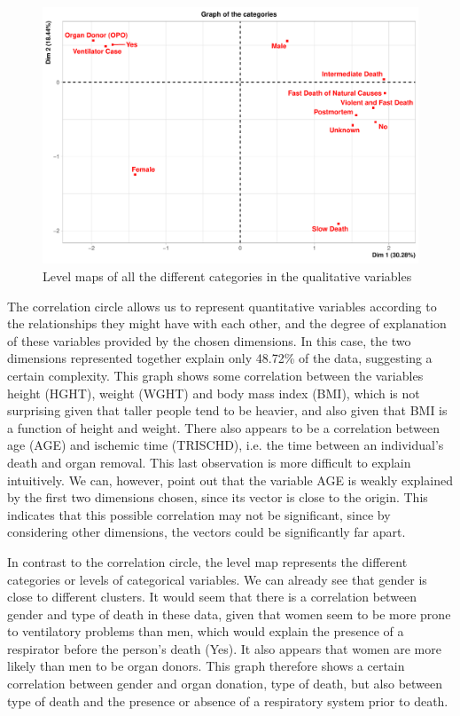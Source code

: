 \documentclass[a4paper, 11pt]{article}
\begin{document}
\begin{multicols}{2}
\begin{figure}[H]
	\centering
	\includegraphics[width=\columnwidth]{figures/clinical_correlation_plots/all_categ_Dim}
	\caption{Level maps of all the different categories in the qualitative variables}
	\label{fig:lvlMap}
\end{figure}

The correlation circle allows us to represent quantitative variables according to the relationships they might have with each other, and the degree of explanation of these variables provided by the chosen dimensions. In this case, the two dimensions represented together explain only 48.72\% of the data, suggesting a certain complexity. 
This graph shows some correlation between the variables height (HGHT), weight (WGHT) and body mass index (BMI), which is not surprising given that taller people tend to be heavier, and also given that BMI is a function of height and weight. 
There also appears to be a correlation between age (AGE) and ischemic time (TRISCHD), i.e. the time between an individual's death and organ removal. This last observation is more difficult to explain intuitively. We can, however, point out that the variable AGE is weakly explained by the first two dimensions chosen, since its vector is close to the origin. This indicates that this possible correlation may not be significant, since by considering other dimensions, the vectors could be significantly far apart.

In contrast to the correlation circle, the level map represents the different categories or levels of categorical variables. We can already see that gender is close to different clusters. It would seem that there is a correlation between gender and type of death in these data, given that women seem to be more prone to ventilatory problems than men, which would explain the presence of a respirator before the person's death (Yes). It also appears that women are more likely than men to be organ donors. This graph therefore shows a certain correlation between gender and organ donation, type of death, but also between type of death and the presence or absence of a respiratory system prior to death.


\end{multicols}
\end{document}
